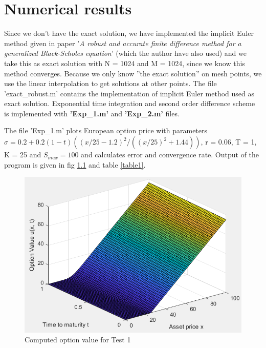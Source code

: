 \chapter{Numerical results}

Since we don't have the exact solution, we have implemented the implicit Euler method given in paper '\textit{A robust and accurate finite difference method for a generalized Black-Scholes equation}' (which the author have also used) and we take this as exact solution with N = 1024 and M = 1024, since we know this method converges. Because we only know ”the exact solution” on mesh points, we use the linear interpolation to get solutions at other points. The file 'exact\_robust.m' contains the implementation of implicit Euler method used as exact solution. Exponential time integration and second order difference scheme is implemented with \textbf{'Exp\_1.m'} and \textbf{'Exp\_2.m'} files.

The file 'Exp\_1.m' plots European option price with parameters $\sigma = 0.2 + 0.2(1 - t)((x/25-1.2)^2/((x/25)^2 + 1.44))$, r = 0.06, T = 1, K = 25 and $S_{max} = 100$ and calculates error and convergence rate. Output of the program is given in fig \ref{fig1} and table \ref{table1}.

\begin{figure}[h]
\centering
\includegraphics[width=1\textwidth]{figures/fig1.PNG}
\caption{Computed option value for Test 1}
\label{fig1}
\end{figure}

